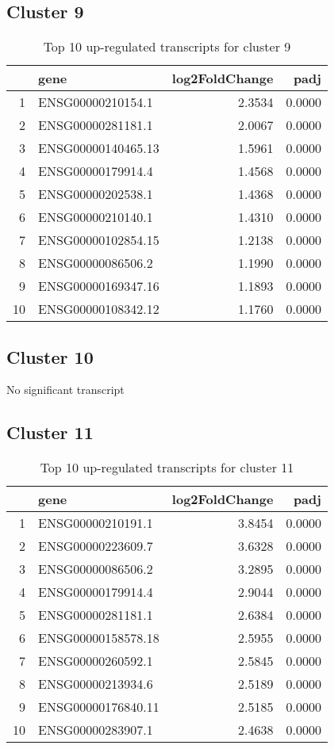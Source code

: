\documentclass{article}
\begin{document}
\subsection{Cluster 9 }
\begin{table}[H]
\centering
\begin{tabular}{rlrr}
  \hline
 & gene & log2FoldChange & padj \\ 
  \hline
1 & ENSG00000210154.1 & 2.3534 & 0.0000 \\ 
  2 & ENSG00000281181.1 & 2.0067 & 0.0000 \\ 
  3 & ENSG00000140465.13 & 1.5961 & 0.0000 \\ 
  4 & ENSG00000179914.4 & 1.4568 & 0.0000 \\ 
  5 & ENSG00000202538.1 & 1.4368 & 0.0000 \\ 
  6 & ENSG00000210140.1 & 1.4310 & 0.0000 \\ 
  7 & ENSG00000102854.15 & 1.2138 & 0.0000 \\ 
  8 & ENSG00000086506.2 & 1.1990 & 0.0000 \\ 
  9 & ENSG00000169347.16 & 1.1893 & 0.0000 \\ 
  10 & ENSG00000108342.12 & 1.1760 & 0.0000 \\ 
   \hline
\end{tabular}
\caption{Top 10 up-regulated transcripts for cluster 9} 
\label{tab:q3_1_9}
\end{table}
\subsection{Cluster 10 }
No significant transcript
\subsection{Cluster 11 }
\begin{table}[H]
\centering
\begin{tabular}{rlrr}
  \hline
 & gene & log2FoldChange & padj \\ 
  \hline
1 & ENSG00000210191.1 & 3.8454 & 0.0000 \\ 
  2 & ENSG00000223609.7 & 3.6328 & 0.0000 \\ 
  3 & ENSG00000086506.2 & 3.2895 & 0.0000 \\ 
  4 & ENSG00000179914.4 & 2.9044 & 0.0000 \\ 
  5 & ENSG00000281181.1 & 2.6384 & 0.0000 \\ 
  6 & ENSG00000158578.18 & 2.5955 & 0.0000 \\ 
  7 & ENSG00000260592.1 & 2.5845 & 0.0000 \\ 
  8 & ENSG00000213934.6 & 2.5189 & 0.0000 \\ 
  9 & ENSG00000176840.11 & 2.5185 & 0.0000 \\ 
  10 & ENSG00000283907.1 & 2.4638 & 0.0000 \\ 
   \hline
\end{tabular}
\caption{Top 10 up-regulated transcripts for cluster 11} 
\label{tab:q3_1_11}
\end{table}
\end{document}
